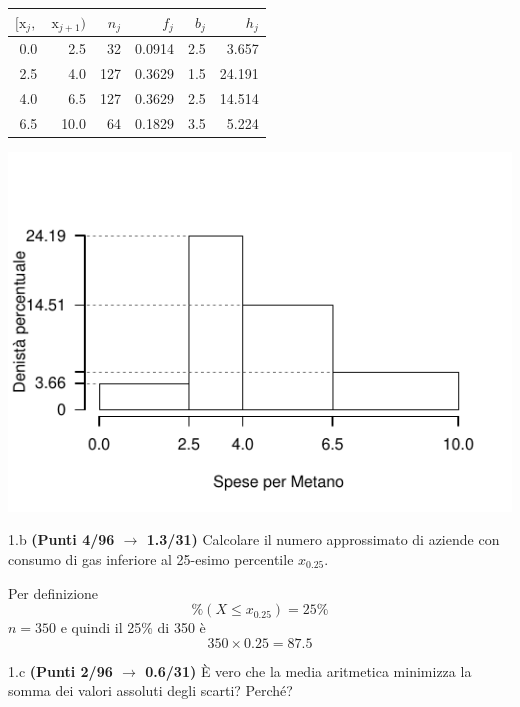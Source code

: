 \documentclass[
  11pt,
]{book}
\theoremstyle{mytheoremstyle}
\theoremstyle{mydefstyle}
\newenvironment{sol}
  {
  \begin{tcolorbox}[enhanced,breakable,arc=0.1mm,boxrule=1pt,colback=white,colframe=iblue,
  title=\bf \fontfamily{lmss}\selectfont \hspace{.5 cm} Soluzione,drop fuzzy shadow]

}{
\end{tcolorbox}
  }
\begin{document}
\begin{sol}

\begin{table}[H]
\centering
\begin{tabular}{rrrrrr}
\toprule
$[\text{x}_j,$ & $\text{x}_{j+1})$ & $n_j$ & $f_j$ & $b_j$ & $h_j$\\
\midrule
0.0 & 2.5 & 32 & 0.0914 & 2.5 & 3.657\\
2.5 & 4.0 & 127 & 0.3629 & 1.5 & 24.191\\
4.0 & 6.5 & 127 & 0.3629 & 2.5 & 14.514\\
6.5 & 10.0 & 64 & 0.1829 & 3.5 & 5.224\\
\bottomrule
\end{tabular}
\end{table}

\begin{center}\includegraphics{Esami_passati_con_soluzioni_files/figure-latex/2021-79-1} \end{center}

\end{sol}

1.b \textbf{(Punti 4/96 \(\rightarrow\) 1.3/31)} Calcolare il numero approssimato di aziende con consumo di gas inferiore al 25-esimo percentile \(x_{0.25}\).

\begin{sol}
Per definizione
\[
\%(X\le x_{0.25})=25\%
\]
\(n=350\) e quindi il 25\% di 350 è
\[
350\times0.25=87.5
\]

\end{sol}

1.c \textbf{(Punti 2/96 \(\rightarrow\) 0.6/31)} È vero che la media aritmetica minimizza la somma dei valori assoluti degli scarti? Perché?
\end{document}
